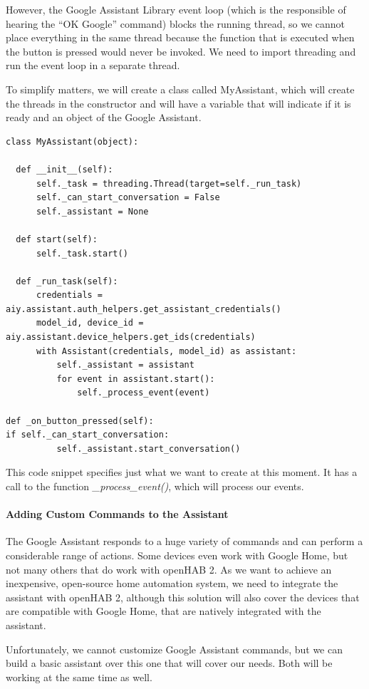 However, the Google Assistant Library event loop (which is the responsible of hearing the “OK Google” command) blocks the running
thread, so we cannot place everything in the same thread because the function that is executed when the button is pressed would
never be invoked. We need to import threading and run the event loop in a separate thread.

To simplify matters, we will create a class called MyAssistant, which will create the threads in the constructor and will have a
variable that will indicate if it is ready and an object of the Google Assistant.

\begin{lstlisting}[style=PythonCode]
class MyAssistant(object):

  def __init__(self):
      self._task = threading.Thread(target=self._run_task)
      self._can_start_conversation = False
      self._assistant = None

  def start(self):
      self._task.start()

  def _run_task(self):
      credentials = aiy.assistant.auth_helpers.get_assistant_credentials()
      model_id, device_id = aiy.assistant.device_helpers.get_ids(credentials)
      with Assistant(credentials, model_id) as assistant:
          self._assistant = assistant
          for event in assistant.start():
              self._process_event(event)

def _on_button_pressed(self):
if self._can_start_conversation:
          self._assistant.start_conversation()
\end{lstlisting}

This code snippet specifies just what we want to create at this moment. It has a call to the function \textit{\_process\_event()},
which will process our events.

\paragraph{Adding Custom Commands to the Assistant}
The Google Assistant responds to a huge variety of commands and can perform a considerable range of actions. Some devices even
work with Google Home, but not many others that do work with openHAB 2. As we want to achieve an inexpensive, open-source home
automation system, we need to integrate the assistant with openHAB 2, although this solution will also cover the devices that are
compatible with Google Home, that are natively integrated with the assistant.

Unfortunately, we cannot customize Google Assistant commands, but we can build a basic assistant over this one that will cover our
needs. Both will be working at the same time as well.

